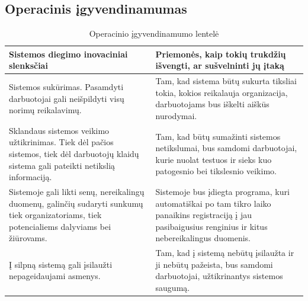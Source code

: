 \documentclass{VUMIFPSkursinis}
\begin{document}
  \subsection{Operacinis įgyvendinamumas} \label{igyvendinamumoIrNaudosAnalize_operacinis}
	\begin{table}[H]
      \caption{Operacinio įgyvendinamumo lentelė}
      \label{table:operacinisIgyvendinamumas}
      \begin{tabularx}{.9\textwidth} [t]{ | X | X |}
        \hline
			\textbf{Sistemos diegimo inovaciniai slenksčiai} & \textbf{Priemonės, kaip tokių trukdžių išvengti, ar sušvelninti jų įtaką} \\
		\hline
			Sistemos sukūrimas. Pasamdyti darbuotojai gali neišpildyti visų norimų reikalavimų. & Tam, kad sistema būtų sukurta tiksliai tokia, kokios reikalauja organizacija, darbuotojams bus iškelti aiškūs nurodymai. \\
        \hline
			Sklandaus sistemos veikimo užtikrinimas. Tiek dėl pačios sistemos, tiek dėl darbuotojų klaidų sistema gali pateikti netikslią informaciją. & Tam, kad būtų sumažinti sistemos netikslumai, bus samdomi darbuotojai, kurie nuolat testuos ir sieks kuo patogesnio bei tikslesnio veikimo. \\
		\hline
			Sistemoje gali likti senų, nereikalingų duomenų, galinčių sudaryti sunkumų tiek organizatoriams, tiek potencialiems dalyviams bei žiūrovams. & Sistemoje bus įdiegta programa, kuri automatiškai po tam tikro laiko panaikins registraciją į jau pasibaigusius renginius ir kitus nebereikalingus duomenis. \\
		\hline
			Į silpną sistemą gali įsilaužti nepageidaujami asmenys. & Tam, kad į sistemą nebūtų įsilaužta ir ji nebūtų pažeista, bus samdomi darbuotojai, užtikrinantys sistemos saugumą. \\
		\hline
      \end{tabularx}
    \end{table}
\end{document}
